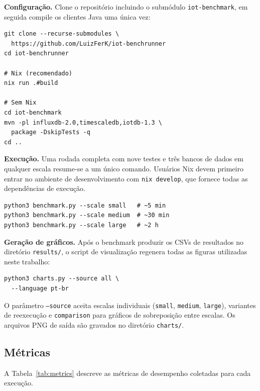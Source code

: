 \textbf{Configuração.} Clone o repositório incluindo o submódulo
\texttt{iot-benchmark}, em seguida compile os clientes Java uma única vez:

\begin{verbatim}
git clone --recurse-submodules \
  https://github.com/LuizFerK/iot-benchrunner
cd iot-benchrunner

# Nix (recomendado)
nix run .#build

# Sem Nix
cd iot-benchmark
mvn -pl influxdb-2.0,timescaledb,iotdb-1.3 \
  package -DskipTests -q
cd ..
\end{verbatim}

\textbf{Execução.} Uma rodada completa com nove testes e três bancos de
dados em qualquer escala resume-se a um único comando. Usuários Nix devem
primeiro entrar no ambiente de desenvolvimento com \texttt{nix~develop},
que fornece todas as dependências de execução.

\begin{verbatim}
python3 benchmark.py --scale small   # ~5 min
python3 benchmark.py --scale medium  # ~30 min
python3 benchmark.py --scale large   # ~2 h
\end{verbatim}

\textbf{Geração de gráficos.} Após o benchmark produzir os CSVs de
resultados no diretório \texttt{results/}, o script de visualização
regenera todas as figuras utilizadas neste trabalho:

\begin{verbatim}
python3 charts.py --source all \
  --language pt-br
\end{verbatim}

O parâmetro \texttt{--source} aceita escalas individuais
(\texttt{small}, \texttt{medium}, \texttt{large}), variantes de
reexecução e \texttt{comparison} para gráficos de sobreposição entre
escalas. Os arquivos PNG de saída são gravados no diretório
\texttt{charts/}.

\subsection{Métricas}
\label{sec:metrics}

A Tabela~\ref{tab:metrics} descreve as métricas de desempenho coletadas para cada execução.

